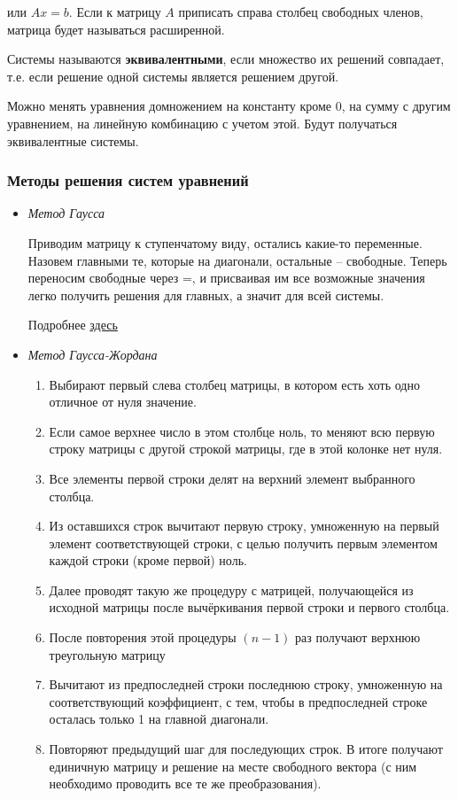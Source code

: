 \documentclass{article}
\begin{document}
или $Ax=b$. Если к матрицу $A$ приписать справа столбец свободных членов, матрица будет называться расширенной.

Системы называются {\bf эквивалентными}, если множество их решений совпадает, т.е. если решение одной системы является решением другой.

Можно менять уравнения домножением на константу кроме 0, на сумму с другим уравнением, на линейную комбинацию с учетом этой. Будут получаться эквивалентные системы.

\subsubsection{Методы решения систем уравнений}

\begin{itemize}
	\item {\it Метод Гаусса}
	
	Приводим матрицу к ступенчатому виду, остались какие-то переменные. Назовем главными те, которые на диагонали, остальные -- свободные. Теперь переносим свободные через =, и присваивая им все возможные значения легко получить решения для главных, а значит для всей системы.
	
	Подробнее \href{https://ru.wikipedia.org/wiki/%D0%9C%D0%B5%D1%82%D0%BE%D0%B4_%D0%93%D0%B0%D1%83%D1%81%D1%81%D0%B0}{здесь}
		
	\item {\it Метод Гаусса-Жордана}
	
	\begin{enumerate}
		\item Выбирают первый слева столбец матрицы, в котором есть хоть одно отличное от нуля значение.
		\item Если самое верхнее число в этом столбце ноль, то меняют всю первую строку матрицы с другой строкой матрицы, где в этой колонке нет нуля.
		\item Все элементы первой строки делят на верхний элемент выбранного столбца.
		\item Из оставшихся строк вычитают первую строку, умноженную на первый элемент соответствующей строки, с целью получить первым элементом каждой строки (кроме первой) ноль.
		\item Далее проводят такую же процедуру с матрицей, получающейся из исходной матрицы после вычёркивания первой строки и первого столбца.
		\item После повторения этой процедуры $(n-1)$ раз получают верхнюю треугольную матрицу
		\item Вычитают из предпоследней строки последнюю строку, умноженную на соответствующий коэффициент, с тем, чтобы в предпоследней строке осталась только 1 на главной диагонали.
		\item Повторяют предыдущий шаг для последующих строк. В итоге получают единичную матрицу и решение на месте свободного вектора (с ним необходимо проводить все те же преобразования).
		

\end{enumerate}
\end{itemize}
\end{document}
